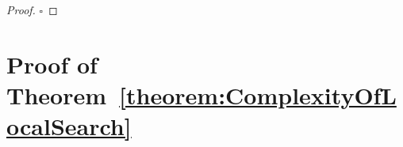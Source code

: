 \documentclass[runningheads,orivec]{llncs}
\newcommand{\MacroColor}[1]{#1}
\newcommand{\MyQED}{\mbox{}\hfill$\square$}
\newcommand{\CompGlobalOptimalProblemName}{\MacroColor{$\overline{\textsc{Recog}}_{\textsc{single}}^{\textsc{global}}$}}
\newcommand{\CompGlobalOptimalProblem}{\hyperref[GlobalOptimalProblemAnchor]{\CompGlobalOptimalProblemName{}}}
\begin{document}
\begin{appendix}
\begin{proof}

\MyQED
\end{proof}

\section{Proof of Theorem~\ref{theorem:ComplexityOfLocalSearch}}
\label{sec:ProofOfTheoremComplexityOfLocalSearch}



\end{appendix}
\end{document}

